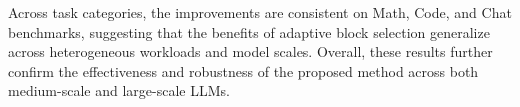 \documentclass{llmxive}
\providecommand{\arraystretch}{1.15}
\begin{document}
Across task categories, the improvements are consistent on Math, Code, and Chat benchmarks, suggesting that the benefits of adaptive block selection generalize across heterogeneous workloads and model scales. Overall, these results further confirm the effectiveness and robustness of the proposed method across both medium-scale and large-scale LLMs.

\end{document}
